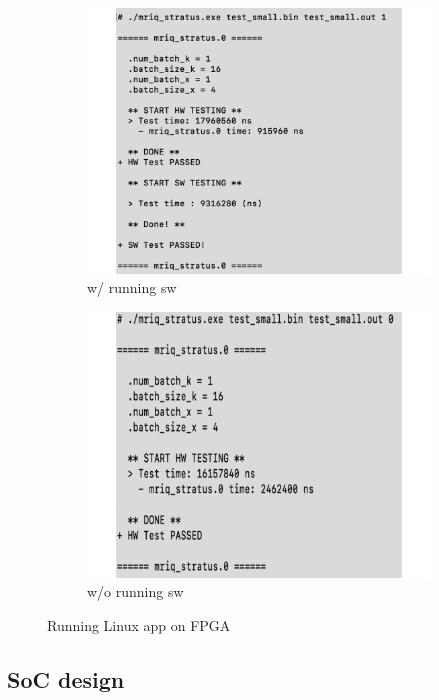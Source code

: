 \begin{figure}[t]
\centering
\begin{subfigure}{.5\columnwidth}
\centering
\includegraphics[width=\columnwidth]{figures/linux-run-sw}
\caption{w/ running sw}
\end{subfigure}%
\begin{subfigure}{.5\columnwidth}
\centering
\includegraphics[width=\columnwidth]{figures/linux-app-wo-run-sw}
\caption{w/o running sw}
\end{subfigure}
\caption{Running Linux app on FPGA}
\label{fig-linux-app}
\end{figure}

\subsection{SoC design}
